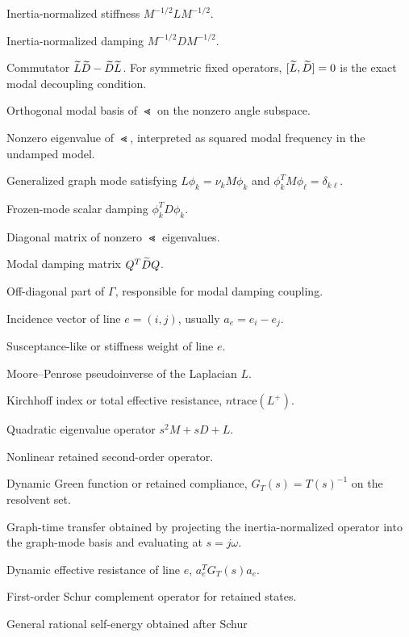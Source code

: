 \begin{description}[leftmargin=3.2cm,style=nextline]
\item[\(\Lt\)] Inertia-normalized stiffness \(M^{-1/2}LM^{-1/2}\).
\item[\(\Dt\)] Inertia-normalized damping \(M^{-1/2}DM^{-1/2}\).
\item[\(\operatorname{comm}(\Lt,\Dt)\)] Commutator \(\widetilde L\widetilde D-\widetilde D\widetilde L\). For symmetric fixed
operators, \([\widetilde L,\widetilde D]=0\) is the exact modal decoupling condition.
\item[\(Q\)] Orthogonal modal basis of \(\Lt\) on the nonzero angle subspace.
\item[\(\nu_k\)] Nonzero eigenvalue of \(\Lt\), interpreted as squared modal
frequency in the undamped model.
\item[\(\phi_k\)] Generalized graph mode satisfying \(L\phi_k=\nu_kM\phi_k\)
and \(\phi_k^TM\phi_\ell=\delta_{k\ell}\).
\item[\(\delta_k\)] Frozen-mode scalar damping \(\phi_k^TD\phi_k\).
\item[\(\Lambda\)] Diagonal matrix of nonzero \(\Lt\) eigenvalues.
\item[\(\Gamma\)] Modal damping matrix \(Q^T\widetilde D Q\).
\item[\(E\)] Off-diagonal part of \(\Gamma\), responsible for modal damping
coupling.
\item[\(a_e\)] Incidence vector of line \(e=(i,j)\), usually \(a_e=e_i-e_j\).
\item[\(b_e\)] Susceptance-like or stiffness weight of line \(e\).
\item[\(L^+\)] Moore--Penrose pseudoinverse of the Laplacian \(L\).
\item[\(K_f\)] Kirchhoff index or total effective resistance, \(n\mathrm{trace}(L^+)\).
\item[\(P(s)\)] Quadratic eigenvalue operator \(s^2M+sD+L\).
\item[\(T(s)\)] Nonlinear retained second-order operator.
\item[\(G_T(s)\)] Dynamic Green function or retained compliance,
\(G_T(s)=T(s)^{-1}\) on the resolvent set.
\item[\(H_G(\omega)\)] Graph-time transfer obtained by projecting the
inertia-normalized operator into the graph-mode basis and evaluating at
\(s=j\omega\).
\item[\(\mathcal R_e(s)\)] Dynamic effective resistance of line \(e\),
\(a_e^TG_T(s)a_e\).
\item[\(S(s)\)] First-order Schur complement operator for retained states.
\item[\(\Pi(s)\)] General rational self-energy obtained after Schur

\end{description}
